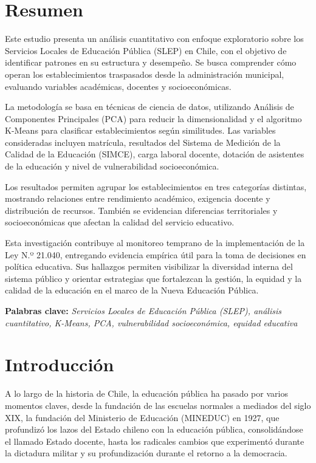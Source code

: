 \documentclass[
  12pt,
  letterpaper,
]{article}
\begin{document}
\section{Resumen}\label{resumen}

Este estudio presenta un análisis cuantitativo con enfoque exploratorio sobre los Servicios Locales de Educación Pública (SLEP) en Chile, con el objetivo de identificar patrones en su estructura y desempeño.
Se busca comprender cómo operan los establecimientos traspasados desde la administración municipal, evaluando variables académicas, docentes y socioeconómicas.

La metodología se basa en técnicas de ciencia de datos, utilizando Análisis de Componentes Principales (PCA) para reducir la dimensionalidad y el algoritmo K-Means para clasificar establecimientos según similitudes.
Las variables consideradas incluyen matrícula, resultados del Sistema de Medición de la Calidad de la Educación (SIMCE), carga laboral docente, dotación de asistentes de la educación y nivel de vulnerabilidad socioeconómica.

Los resultados permiten agrupar los establecimientos en tres categorías distintas, mostrando relaciones entre rendimiento académico, exigencia docente y distribución de recursos.
También se evidencian diferencias territoriales y socioeconómicas que afectan la calidad del servicio educativo.

Esta investigación contribuye al monitoreo temprano de la implementación de la Ley N.º 21.040, entregando evidencia empírica útil para la toma de decisiones en política educativa.
Sus hallazgos permiten visibilizar la diversidad interna del sistema público y orientar estrategias que fortalezcan la gestión, la equidad y la calidad de la educación en el marco de la Nueva Educación Pública.

\textbf{Palabras clave:} \emph{Servicios Locales de Educación Pública (SLEP), análisis cuantitativo, K-Means, PCA, vulnerabilidad socioeconómica, equidad educativa}

\newpage

\section{Introducción}\label{introducciuxf3n}

A lo largo de la historia de Chile, la educación pública ha pasado por varios momentos claves, desde la fundación de las escuelas normales a mediados del siglo XIX, la fundación del Ministerio de Educación (MINEDUC) en 1927, que profundizó los lazos del Estado chileno con la educación pública, consolidándose el llamado Estado docente, hasta los radicales cambios que experimentó durante la dictadura militar y su profundización durante el retorno a la democracia.
\end{document}
